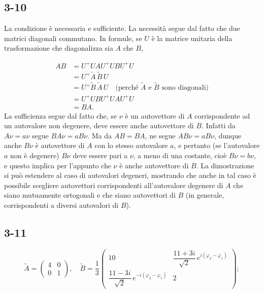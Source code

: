 \documentclass[11pt, a4paper]{book}
\numberwithin{equation}{section}
\begin{document}
\subsection*{3-10}
La condizione è necessaria e sufficiente. La necessità segue dal fatto
che due matrici diagonali commutano. In formule, se $U$ è la matrice
unitaria della trasformazione che diagonalizza sia $A$ che $B$,


\begin{align*}
AB &= U^+UAU^+UBU^+U \\
   &= U^+\widetilde{A}\,\widetilde{B}\,U \\
   &= U^+\widetilde{B}\,\widetilde{A}\,U
      \quad \text{(perché $\widetilde{A}$ e $\widetilde{B}$ sono diagonali)} \\
   &= U^+UBU^+UAU^+U \\
   &= BA.
\end{align*}
La sufficienza segue dal fatto che, se $\nu$ è un autovettore di $A$
corrispondente ad un autovalore non degenere, deve essere anche
autovettore di $B$. Infatti da $A\nu = a\nu$ segue $BA\nu = aB\nu$.
Ma da $AB = BA$, ne segue $AB\nu = aB\nu$, dunque anche $B\nu$ è
autovettore di $A$ con lo stesso autovalore $a$, e pertanto (se
l'autovalore $a$ non è degenere) $B\nu$ deve essere pari a $\nu$, a
meno di una costante, cioè $B\nu = b\nu$, e questo implica per l'appunto
che $\nu$ è anche autovettore di $B$. La dimostrazione si può estendere
al caso di autovalori degeneri, mostrando che anche in tal caso è
possibile scegliere autovettori corrispondenti all'autovalore degenere di
$A$ che siano mutuamente ortogonali e che siano autovettori di $B$ (in
generale, corrispondenti a diversi autovalori di $B$).

\subsection*{3-11}
\[
\widetilde{A} = \begin{pmatrix} 4 & 0 \\ 0 & 1 \end{pmatrix},
\quad
\widetilde{B} = \frac{1}{3}
\begin{pmatrix}
10 & \dfrac{11+3i}{\sqrt{2}}\,e^{i(\varphi_2-\varphi_1)} \\[6pt]
\dfrac{11-3i}{\sqrt{2}}\,e^{-i(\varphi_2-\varphi_1)} & 2
\end{pmatrix};
\]

\end{document}
